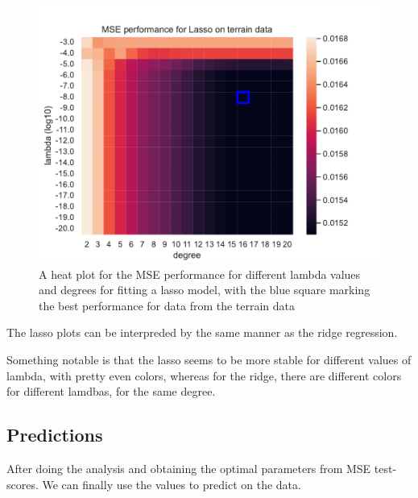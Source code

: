 \documentclass[12pt]{article}
\begin{document}
\begin{figure}[H]
    \centering
    \includegraphics[width=0.65\columnwidth]{../src/output/mse_heat_plot_terrain_data_Lasso.pdf}
    \caption{A heat plot for the MSE performance for different lambda values and degrees for fitting a lasso model, with the blue square marking the best performance for data from the terrain data}
    \label{fig:mse_heat_map_terrain_lasso}
\end{figure}

The lasso plots can be interpreded by the same manner as the ridge regression.

Something notable is that the lasso seems to be more stable for different values of lambda, with pretty even colors, whereas for the ridge, there are different colors for different lamdbas, for the same degree.

\subsection{Predictions}

After doing the analysis and obtaining the optimal parameters from MSE test-scores. We can finally use the values to predict on the data.
\end{document}
